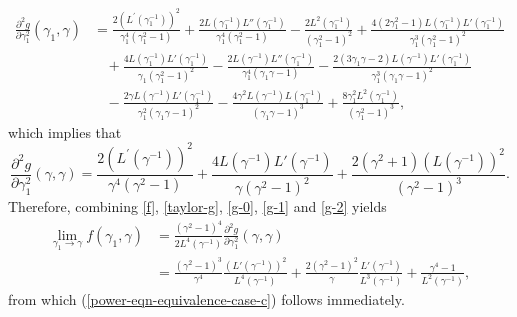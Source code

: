 \documentclass[12pt]{article}
\begin{document}
\begin{equation*}
   \begin{aligned}
      \frac{\partial^2 g}{\partial \gamma^2_1}(\gamma_1,\gamma)&= \frac{2(L^\prime(\gamma_1^{-1}))^2}{\gamma_1^4(\gamma_1^2-1)} + \frac{2 L(\gamma_1^{-1}) L''(\gamma_1^{-1})}{\gamma_1^4 (\gamma_1^2 - 1)} - \frac{2L^2(\gamma_1^{-1})}{(\gamma_1^2 - 1)^2}+\frac{4(2\gamma_1^2-1)L(\gamma_1^{-1})L'(\gamma_1^{-1})}{\gamma_1^3(\gamma_1^2-1)^2}\\
      &~~~~ + \frac{4L(\gamma_1^{-1})L'(\gamma_1^{-1})}{\gamma_1(\gamma_1^2 - 1)^2}-\frac{2L(\gamma^{-1})L''(\gamma_1^{-1})}{\gamma_1^4(\gamma_1\gamma-1)}- \frac{2(3\gamma_1\gamma-2)L(\gamma^{-1})L'(\gamma_1^{-1})}{\gamma_1^3(\gamma_1\gamma-1)^2}\\
      &~~~~-\frac{2\gamma L(\gamma^{-1})L'(\gamma_1^{-1})}{\gamma_1^2(\gamma_1\gamma-1)^2} - \frac{4\gamma^2 L(\gamma^{-1})L(\gamma_1^{-1})}{(\gamma_1\gamma-1)^3}+\frac{8 \gamma_1^2 L^2(\gamma_1^{-1})}{(\gamma_1^2 - 1)^3},
   \end{aligned}
\end{equation*}
which implies that
\begin{equation}\label{g-2}
   \frac{\partial^2g}{\partial \gamma_1^2}(\gamma,\gamma)=\frac{2\left(L^\prime(\gamma^{-1})\right)^2}{\gamma^4(\gamma^2-1)} +\frac{4L(\gamma^{-1}) L'(\gamma^{-1})}{\gamma(\gamma^2-1)^2} +\frac{2(\gamma^2 + 1)\left(L(\gamma^{-1})\right)^2}{(\gamma^2 - 1)^3}.
\end{equation}
Therefore, combining \eqref{f}, \eqref{taylor-g}, \eqref{g-0}, \eqref{g-1} and \eqref{g-2} yields
\begin{equation*}
\begin{aligned}
   \lim_{\gamma_1 \to \gamma} f(\gamma_1, \gamma) &= \frac{(\gamma^2 - 1)^4}{2 L^4 (\gamma^{-1})} \frac{\partial^2 g}{\partial \gamma_1^2} (\gamma, \gamma)\\
   &=\frac{(\gamma^2 - 1)^3}{\gamma^4} 
\frac{\left(L'(\gamma^{-1})\right)^2}{L^4(\gamma^{-1})} + \frac{2 (\gamma^2 - 1)^2}{\gamma} \frac{L'(\gamma^{-1})}{L^3(\gamma^{-1})} + \frac{\gamma^4 - 1}{L^2(\gamma^{-1})},
\end{aligned}
\end{equation*}
from which (\ref{power-eqn-equivalence-case-c}) follows immediately.






\newpage



\end{document}
